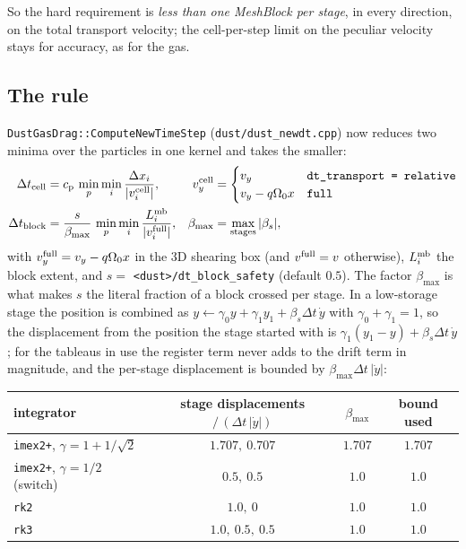 \documentclass[11pt]{article}
\newcommand{\code}[1]{\texttt{#1}}
\newcommand{\file}[1]{\texttt{\small #1}}
\newcommand{\fn}[1]{\texttt{\small #1}}
\newcommand{\Om}{\Omega_0}
\newcommand{\qom}{q\Om}
\begin{document}
So the hard requirement is \emph{less than one MeshBlock per stage}, in every
direction, on the total transport velocity; the cell-per-step limit on the peculiar
velocity stays for accuracy, as for the gas.

\subsection{The rule}

\fn{DustGasDrag::ComputeNewTimeStep} (\file{dust/dust\_newdt.cpp}) now reduces two
minima over the particles in one kernel and takes the smaller:
\begin{align}
\Delta t_{\rm cell}  &= c_{\rm p}\,\min_p \min_i \frac{\Delta x_i}{|v_i^{\rm cell}|},
   & v_y^{\rm cell} &= \begin{cases} v_y & \text{\code{dt\_transport = relative}}\\
                                      v_y - \qom x & \text{\code{full}} \end{cases}\\
\Delta t_{\rm block} &= \frac{s}{\beta_{\max}}\,\min_p \min_i
   \frac{L_i^{\rm mb}}{|v_i^{\rm full}|},
   & \beta_{\max} &= \max_{\rm stages} |\beta_s|,
\end{align}
with $v^{\rm full}_y = v_y - \qom x$ in the 3D shearing box (and $v^{\rm full} = v$
otherwise), $L_i^{\rm mb}$ the block extent, and $s = $ \code{<dust>/dt\_block\_safety}
(default $0.5$). The factor $\beta_{\max}$ is what makes $s$ the literal fraction of a
block crossed per stage. In a low-storage stage the position is combined as
$y \leftarrow \gamma_0 y + \gamma_1 y_1 + \beta_s\Delta t\,\dot y$ with
$\gamma_0 + \gamma_1 = 1$, so the displacement from the position the stage started
with is $\gamma_1(y_1 - y) + \beta_s\Delta t\,\dot y$; for the tableaus in use the
register term never adds to the drift term in magnitude, and the per-stage
displacement is bounded by $\beta_{\max}\Delta t\,|\dot y|$:

\begin{center}
\small
\begin{tabular}{@{}lccc@{}}
\toprule
integrator & stage displacements $/\,(\Delta t\,|\dot y|)$ & $\beta_{\max}$ & bound used \\
\midrule
\code{imex2+}, $\gamma = 1 + 1/\sqrt2$ & $1.707,\ 0.707$ & $1.707$ & $1.707$ \\
\code{imex2+}, $\gamma = 1/2$ (switch) & $0.5,\ 0.5$ & $1.0$ & $1.0$ \\
\code{rk2} & $1.0,\ 0$ & $1.0$ & $1.0$ \\
\code{rk3} & $1.0,\ 0.5,\ 0.5$ & $1.0$ & $1.0$ \\
\bottomrule
\end{tabular}
\end{center}
\end{document}
